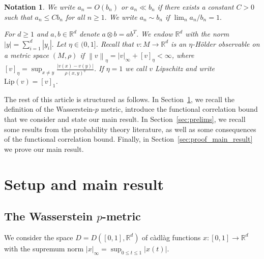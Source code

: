 \documentclass[11pt,a4paper,reqno,oneside]{amsart}
\newcommand{\R}{\ensuremath{\mathbb{R}}}%
\newcommand{\norm}[1]{\left\lVert#1\right\rVert}
\newcommand{\norminf}[1]{\left|#1\right|_\infty}
\newcommand{\ms}{M}
\newcommand{\map}[2]{\colon#1\rightarrow#2}
\newcommand{\Lip}{\mathrm{Lip}}
\newcommand{\dsemi}[1]{[#1]_{\eta}}
\newcommand{\dhnorm}[1]{\norm{#1}_\eta}
\newtheorem*{notation}{Notation}
\theoremstyle{definition}
\theoremstyle{remark}
\numberwithin{equation}{section}
\begin{document}
	\begin{notation}
		We write $a_n=O(b_n) $ or $ a_n\ll b_n $ if there exists a constant $ C>0 $ such that $ a_n\le Cb_n $ for all $ n\ge 1. $ We write $ a_n\sim b_n $ if $ \lim_n a_n/b_n=1. $
		
		For $ d\ge 1 $ and $ a,b\in \R^d $ denote $ a\otimes b=ab^T. $ We endow $ \R^d $ with the norm $ |y|=\sum_{i=1}^d |y_i|. $ Let $ \eta\in (0,1] $. Recall that $ v\map{\ms}{\R^d} $ is an $ \eta $-H\"older observable on a metric space $(M,\rho)$ if $ \dhnorm{v}=\norminf{v}+\dsemi{v} <\infty$, where $\dsemi{v}=\sup_{x\ne y}\frac{|v(x)-v(y)|}{\rho(x,y)^\eta}$. If $ \eta=1 $ we call $ v $ Lipschitz and write $ \Lip(v)=[v]_1 $.
	\end{notation}	
	The rest of this article is structured as follows. In Section~\ref{sec:main_result}, we recall the definition of the Wasserstein-$p$ metric, introduce the functional correlation bound that we consider and state our main result. In Section~\ref{sec:prelims}, we recall some results from the probability theory literature, as well as some consequences of the functional correlation bound. Finally, in Section~\ref{sec:proof_main_result} we prove our main result.
	\section{Setup and main result}\label{sec:main_result}
	\subsection{The Wasserstein $p$-metric} We consider the space $D = D([0,1],\R^d)$ of c\`adl\`ag functions $x:[0,1]\to \R^d$ with the supremum norm $\norminf{x}=\sup_{0\le t\le 1}|x(t)|$. 
\end{document}
